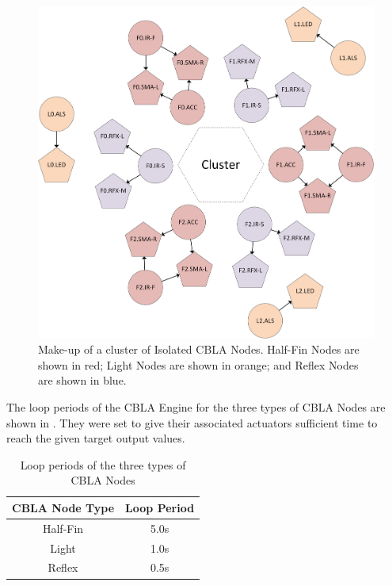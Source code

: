 \begin{figure} [!htbp]
	\centering
	\includegraphics[width=1.0\textwidth]{"fig/validations/Isolated CBLA Nodes"}
	\caption[Make-up of a cluster of Isolated CBLA Nodes]{Make-up of a cluster of Isolated CBLA Nodes. Half-Fin Nodes are shown in red; Light Nodes are shown in orange; and Reflex Nodes are shown in blue.}
	\label{fig:Isolated CBLA Nodes}
\end{figure}

The loop periods of the CBLA Engine for the three types of CBLA Nodes are shown in . They were set to give their associated actuators sufficient time to reach the given target output values. 

\begin{table}[!htb]
	\caption[Loop periods of CBLA Nodes]{Loop periods of the three types of CBLA Nodes}
	\begin{center}
		\begin{tabular}{ | c | c |} 
			\hline
			\textbf{CBLA Node Type} & \textbf{Loop Period} \\ 
			\hline\hline
			Half-Fin & 5.0s \\ 
			\hline
			Light & 1.0s \\
			\hline
			Reflex & 0.5s \\ 
			\hline
		\end{tabular}
	\end{center}
	\label{table:cbla-loop-perids}
\end{table}

